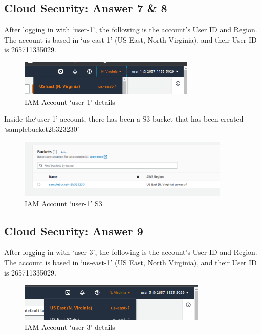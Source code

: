 \documentclass[
  11pt, %
]{assignment}
\begin{document}
\subsection*{Cloud Security: Answer 7 \& 8}

After logging in with `user-1', the following is the account's User ID and Region. The account is based in `us-east-1' (US East, North Virginia), and their User ID is 265711335029.

\begin{figure}[H]
	\centering
	\includegraphics[width=0.75\textwidth]{graphics/section3/IAMUser1AccIdZone.png}
	\caption{IAM Account `user-1' details}\label{fig:iamloginuser1}
\end{figure}

Inside the`user-1' account, there has been a S3 bucket that has been created `samplebucket\-2b323230'

\begin{figure}[H]
	\centering
	\includegraphics[width=0.9\textwidth]{graphics/section3/IAMUser1S3.png}
	\caption{IAM Account `user-1' S3}\label{fig:iamloginuser1s3}
\end{figure}

\pagebreak

\subsection*{Cloud Security: Answer 9}

After logging in with `user-3', the following is the account's User ID and Region. The account is based in `us-east-1' (US East, North Virginia), and their User ID is 265711335029.

\begin{figure}[H]
	\centering
	\includegraphics[width=0.8\textwidth]{graphics/section3/IAMUser3AccIdZone.png}
	\caption{IAM Account `user-3' details}\label{fig:iamloginuser3}
\end{figure}
\end{document}
